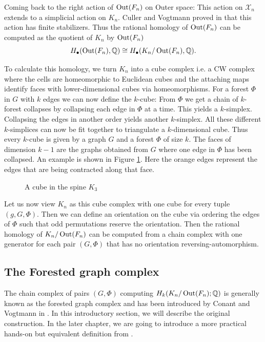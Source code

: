 Coming back to the right action of $\operatorname{Out}(F_{n})$ on Outer space: This action on $\mathcal{X}_{n}$ extends to a simplicial action on $K_{n}$.
Culler and Vogtmann proved in \cite{vogtmann86} that this action has finite stabilizers.
Thus the rational homology of $\operatorname{Out}(F_{n})$ can be computed as the quotient of $K_{n}$ by $\operatorname{Out}(F_{n})$
\[
	H_{\bullet}(\operatorname{Out}(F_{n}),\mathbb{Q}) \cong H_{\bullet}(K_{n}/ \operatorname{Out}(F_{n}),\mathbb{Q})
.\] 

To calculate this homology, we turn $K_{n}$ into a cube complex i.e. a CW complex where the cells are homeomorphic
to Euclidean cubes and the attaching maps identify faces with lower-dimensional cubes via homeomorphisms.
For a forest $\Phi$ in $G$ with $k$ edges we can now define the $k$-cube:
From $\Phi$ we get a chain of $k$-forest collapses by collapsing each edge in $\Phi$ at a time.
This yields a $k$-simplex. Collapsing the edges in another order yields another $k$-simplex.
All these different $k$-simplices can now be fit together to triangulate a $k$-dimensional cube.
Thus every $k$-cube is given by a graph $G$ and a forest $\Phi$ of size $k$.
The faces of dimension $k-1$ are the graphs obtained from $G$ where one edge in $\Phi$ has been collapsed.
An example is shown in Figure \ref{fig:spineCube}. Here the orange edges represent the edges that are being contracted along that face.

\begin{figure}[htbp]
	\centering
	\caption{A cube in the spine $K_{3}$}
	\label{fig:spineCube}
\end{figure}
Let us now view $K_{n}$ as this cube complex with one cube for every tuple $(g,G,\Phi)$. 
Then we can define an orientation on the cube via ordering the edges of $\Phi$ such that odd permutations reserve the orientation. 
Then the rational homology of $K_{n} / \operatorname{Out}(F_{n})$ can be computed from a chain complex with one generator for each pair $(G,\Phi)$ that has no orientation
reversing-automorphism.

\subsection{The Forested graph complex}

The chain complex of pairs $(G,\Phi)$ computing $H_{k}(K_{n} / \operatorname{Out}(F_{n});\mathbb{Q})$ is generally known as the forested graph complex and has been
introduced by Conant and Vogtmann in \cite{conant03}. In this introductory section,
we will describe the original construction. In the later chapter, we are going to
introduce a more practical hands-on but equivalent definition from \cite{conant08}.


